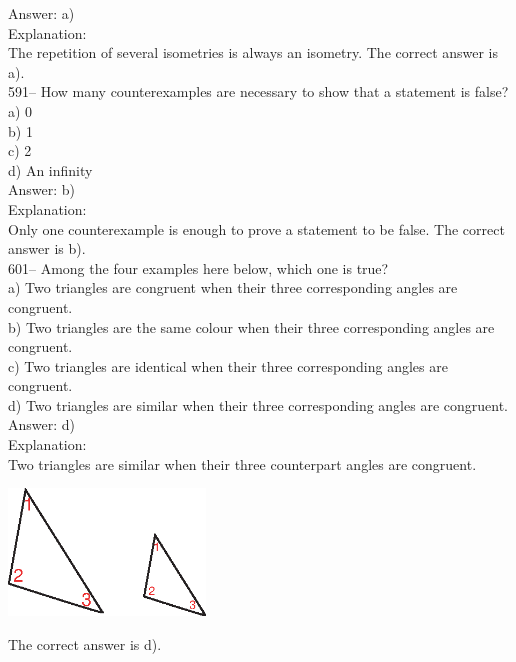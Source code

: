 \documentclass[letterpaper, 12pt]{article}
\begin{document}
Answer: a)\\

Explanation: \\
The repetition of several isometries is always an isometry.
The correct answer is a).\\


591-- How many counterexamples are necessary to show that a statement is false?\\

a) 0\\
b) 1\\
c) 2\\
d) An infinity\\

Answer: b)\\

Explanation: \\
Only one counterexample is enough to prove a statement to be false.
The correct answer is b).\\



601-- Among the four examples here below, which one is true?\\

a) Two triangles are congruent when their three corresponding angles are congruent.\\
b) Two triangles are the same colour when their three corresponding angles are congruent.\\
c) Two triangles are identical when their three corresponding angles are congruent.\\
d) Two triangles are similar when their three corresponding angles are congruent.\\

Answer: d) \\

Explanation: \\
Two triangles are similar when their three counterpart angles are congruent.   \begin{center}
    \includegraphics[height=3.39cm]{601.eps}
    \end{center}  The correct answer is d).\\
\end{document}
